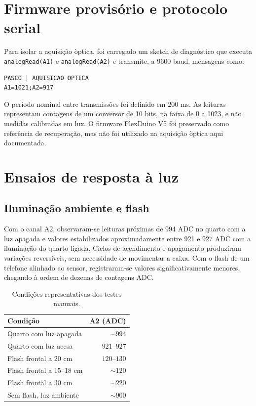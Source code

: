 \documentclass[10pt,a4paper,twocolumn]{article}
\begin{document}
\section{Firmware provis\'orio e protocolo serial}
Para isolar a aquisi\c{c}\~ao \`optica, foi carregado um sketch de diagn\'ostico que executa \texttt{analogRead(A1)} e \texttt{analogRead(A2)} e transmite, a 9600 baud, mensagens como:
\begin{lstlisting}
PASCO | AQUISICAO OPTICA
A1=1021;A2=917
\end{lstlisting}
O per\'iodo nominal entre transmiss\~oes foi definido em 200 ms. As leituras representam contagens de um conversor de 10 bits, na faixa de 0 a 1023, e n\~ao medidas calibradas em lux. O firmware FlexDuino V5 foi preservado como refer\^encia de recupera\c{c}\~ao, mas n\~ao foi utilizado na aquisi\c{c}\~ao \`optica aqui documentada.

\section{Ensaios de resposta \`a luz}
\subsection{Ilumina\c{c}\~ao ambiente e flash}
Com o canal A2, observaram-se leituras pr\'oximas de 994 ADC no quarto com a luz apagada e valores estabilizados aproximadamente entre 921 e 927 ADC com a ilumina\c{c}\~ao do quarto ligada. Ciclos de acendimento e apagamento produziram varia\c{c}\~oes revers\'iveis, sem necessidade de movimentar a caixa. Com o flash de um telefone alinhado ao sensor, registraram-se valores significativamente menores, chegando \`a ordem de dezenas de contagens ADC.

\begin{table}[H]
\centering\footnotesize
\caption{Condi\c{c}\~oes representativas dos testes manuais.}
\begin{tabular}{@{}p{}r@{}}
\toprule
Condi\c{c}\~ao & A2 (ADC) \\
\midrule
Quarto com luz apagada & $\sim 994$ \\
Quarto com luz acesa & $921$--$927$ \\
Flash frontal a 20 cm & $120$--$130$ \\
Flash frontal a 15--18 cm & $\sim 120$ \\
Flash frontal a 30 cm & $\sim 220$ \\
Sem flash, luz ambiente & $\sim 900$ \\
\bottomrule
\end{tabular}
\end{table}
\end{document}
